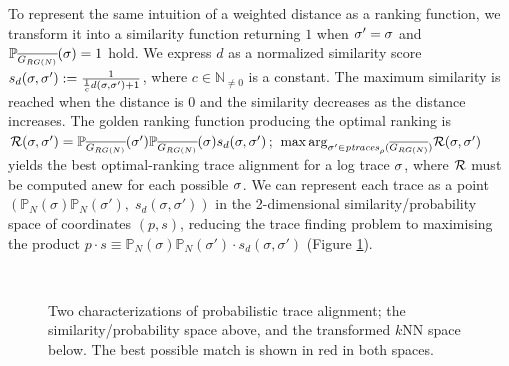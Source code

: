 To represent the same intuition of a weighted distance as a ranking function, we transform it into a
similarity function returning $1$ when $\nonlogtrace=\logtrace$ and $\probskip{\logtrace}=1$ hold. We express $d$ as
a normalized similarity score $s_d(\logtrace,\nonlogtrace):=\frac{1}{\frac{1}{c}d(\logtrace,\nonlogtrace)+1}$, where  
$c\in\mathbb{N}_{\neq0}$ is a constant. The maximum similarity is reached when the distance is $0$ and the similarity decreases 
as the distance increases. 
 The golden ranking function producing the optimal ranking is 
 $\goldenrank(\logtrace,\nonlogtrace)=\probskip{\nonlogtrace} \probskip{\logtrace} s_d(\logtrace,\nonlogtrace)$;
${\max\arg}_{\nonlogtrace\in \WCal{\pmin}{n}} \goldenrank(\logtrace,{\nonlogtrace})$ yields the best optimal-ranking trace 
alignment for a log trace $\logtrace$, where $\goldenrank$ must be computed anew for each possible $\logtrace$. 
{We can represent each trace as a point  $(\mathbb{P}_N(\sigma)\mathbb{P}_N(\sigma'),\; s_d(\sigma,\sigma'))$ in the 
2-dimensional similarity/probability space of coordinates $(p,s)$, reducing the trace finding problem to maximising the product 
$p\cdot s\equiv \mathbb{P}_N(\sigma)\mathbb{P}_N(\sigma')\cdot s_d(\sigma,\sigma')$ (Figure \ref{fig:sps}).}
%
\begin{figure}[!t]
	\centering
	\\
	\caption{Two characterizations of probabilistic trace alignment; the similarity/probability space above, and the transformed
	$k$NN space below. The best possible match is shown in red in both spaces.}\label{fig:sps}
\end{figure}


